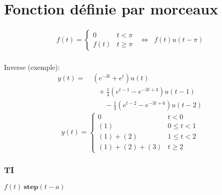 \section{Fonction définie par morceaux}
\vspace{-2.5\baselineskip}
\begin{gather*}
f(t) = \left\{ \begin{array}{cc}
 0 & t < \pi \\
 f(t) & t \geq \pi
  \end{array}
  \right.
\;\;\Longleftrightarrow\;\; f(t)u(t-\pi)
\end{gather*}\vspace{-\baselineskip}\\
Inverse (exemple):
\begin{align*}
 y(t)   =&\; (e^{-3t}+e^t)u(t)\tag{1}\\
        &\quad+\frac{1}{4}(e^{t-1}-e^{-3t+3})u(t-1)\tag{2}\\
        &\qquad-\frac{1}{4}(e^{t-2}-e^{-3t+6})u(t-2)\tag{3}
\end{align*}
\begin{equation*}
y(t) = \left\{ \begin{array}{cc}
 0 & t < 0 \\
 (1) & 0\leq t<1\\
 (1)+(2) & 1\leq t<2\\
 (1)+(2)+(3) & t\geq 2
  \end{array}
  \right.
\end{equation*}

\subsubsection{TI}
\centering
\(f(t)\:\mathbf{step}(t-a)\)\\\raggedright